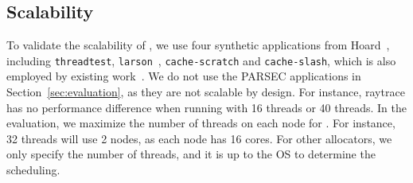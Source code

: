 \subsection{Scalability}
\label{sec:scale}


To validate the scalability of \NM{}, we use four synthetic applications from Hoard~\cite{Hoard}, including \texttt{threadtest}, \texttt{larson}~\cite{Larson}, \texttt{cache-scratch} and \texttt{cache-slash}, which is also employed by existing work~\cite{Scalloc}. We do not use the PARSEC applications in Section~\ref{sec:evaluation}, as they are not scalable by design.
For instance, raytrace has no performance difference when running with 16 threads or 40 threads.
In the evaluation, we maximize the number of threads on each node for \NM{}. For instance, 32 threads will use 2 nodes, as each node has 16 cores. For other allocators, we only specify the number of threads, and it is up to the OS to determine the scheduling. 
 
